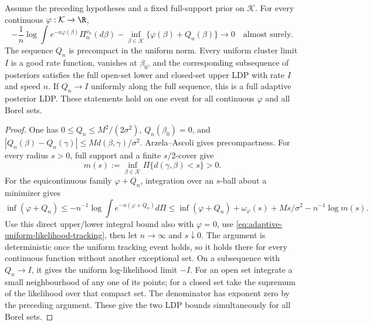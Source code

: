 \begin{theorem}
\label{thm:adaptive-laplace-tracking}
Assume the preceding hypotheses and a fixed full-support prior on
\(\mathcal K\). For every continuous \(\varphi:\mathcal K\to\R\),
\begin{equation}
 -\frac1n\log\int e^{-n\varphi(\beta)}\Pi_n^{\nu_n}(d\beta)
 -\inf_{\beta\in\mathcal K}\{\varphi(\beta)+Q_n(\beta)\}
 \longrightarrow0\quad\text{almost surely}.
 \label{eq:adaptive-laplace-tracking}
\end{equation}
The sequence \(Q_n\) is precompact in the uniform norm. Every uniform
cluster limit \(I\) is a good rate function, vanishes at \(\beta_0\),
and the corresponding subsequence of posteriors satisfies the full
open-set lower and closed-set upper LDP with rate \(I\) and speed \(n\).
If \(Q_n\to I\) uniformly along the full sequence, this is a full adaptive
posterior LDP. These statements hold on one event for all continuous
\(\varphi\) and all Borel sets.
\end{theorem}
\begin{proof}
One has \(0\le Q_n\le M^2/(2\sigma^2)\), \(Q_n(\beta_0)=0\), and
\(|Q_n(\beta)-Q_n(\gamma)|\le M d(\beta,\gamma)/\sigma^2\).
Arzela--Ascoli gives precompactness. For every radius \(s>0\), full
support and a finite \(s/2\)-cover give
\[
 m(s):=\inf_{\beta\in\mathcal K}\Pi\{d(\gamma,\beta)<s\}>0.
\]
For the equicontinuous family \(\varphi+Q_n\), integration over an
\(s\)-ball about a minimizer gives
\[
 \inf(\varphi+Q_n)\le -n^{-1}\log\int e^{-n(\varphi+Q_n)}d\Pi
 \le\inf(\varphi+Q_n)+\omega_\varphi(s)+Ms/\sigma^2
       -n^{-1}\log m(s).
\]
Use this direct upper/lower integral bound also
with \(\varphi=0\), use \eqref{eq:adaptive-uniform-likelihood-tracking},
then let \(n\to\infty\) and \(s\downarrow0\).
The argument is deterministic once the uniform tracking event holds, so it
holds there for every continuous function without another exceptional set.
On a subsequence with \(Q_n\to I\), it gives the uniform log-likelihood
limit \(-I\). For an open set integrate a small neighbourhood of any one
of its points; for a closed set take the supremum of the likelihood over
that compact set. The denominator has exponent zero by the preceding
argument. These give the two LDP bounds simultaneously for all Borel sets.
\end{proof}
